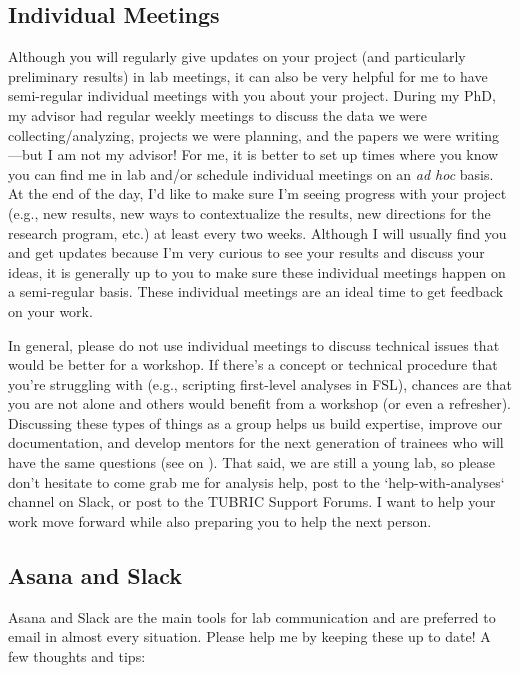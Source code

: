\documentclass[letterpaper,12pt,oneside]{memoir}
\begin{document}
\subsection{Individual Meetings}
Although you will regularly give updates on your project (and particularly preliminary results) in lab meetings, it can also be very helpful for me to have semi-regular individual meetings with you about your project. During my PhD, my advisor had regular weekly meetings to discuss the data we were collecting/analyzing, projects we were planning, and the papers we were writing---but I am not my advisor! For me, it is better to set up times where you know you can find me in lab and/or schedule individual meetings on an \textit{ad hoc} basis. At the end of the day, I'd like to make sure I'm seeing progress with your project (e.g., new results, new ways to contextualize the results, new directions for the research program, etc.) at least every two weeks. Although I will usually find you and get updates because I'm very curious to see your results and discuss your ideas, it is generally up to you to make sure these individual meetings happen on a semi-regular basis. These individual meetings are an ideal time to get feedback on your work.

In general, please do not use individual meetings to discuss technical issues that would be better for a workshop. If there's a concept or technical procedure that you're struggling with (e.g., scripting first-level analyses in FSL), chances are that you are not alone and others would benefit from a workshop (or even a refresher). Discussing these types of things as a group helps us build expertise, improve our documentation, and develop mentors for the next generation of trainees who will have the same questions (see  on ). That said, we are still a young lab, so please don't hesitate to come grab me for analysis help, post to the `help-with-analyses` channel on Slack, or post to the TUBRIC Support Forums. I want to help your work move forward while also preparing you to help the next person.


\subsection{Asana and Slack}
Asana and Slack are the main tools for lab communication and are preferred to email in almost every situation. Please help me by keeping these up to date! A few thoughts and tips:
\end{document}
